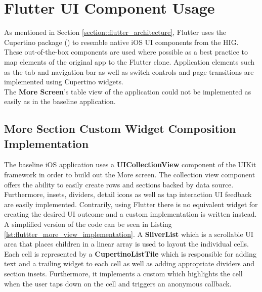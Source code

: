 \section{Flutter UI Component Usage} \label{section::flutter_ui_component_usage}
As mentioned in Section \ref{section::flutter_architecture}, Flutter uses the Cupertino package (\cite{CupertinoPackageDocumentation2021}) to resemble native iOS UI components from the HIG.
These out-of-the-box components are used where possible as a best practice to map elements of the original app to the Flutter clone. 
Application elements such as the tab and navigation bar as well as switch controls and page transitions are implemented using Cupertino widgets.\\
The \textbf{More Screen}'s table view of the application could not be implemented as easily as in the baseline application.

\subsection{More Section Custom Widget Composition Implementation}
The baseline iOS application uses a \textbf{UICollectionView} component of the UIKit framework in order to build out the More screen.
The collection view component offers the ability to easily create rows and sections backed by data source. 
Furthermore, insets, dividers, detail icons as well as tap interaction UI feedback are easily implemented. 
Contrarily, using Flutter there is no equivalent widget for creating the desired UI outcome and a custom implementation is written instead. 
A simplified version of the code can be seen in Listing \ref{lst:fluttter_more_view_implementation}.
A \textbf{SliverList} which is a scrollable UI area that places children in a linear array is used to layout the individual cells.
Each cell is represented by a \textbf{CupertinoListTile} which is responsible for adding text and a trailing widget to each cell as well as adding appropriate dividers and section insets.
Furthermore, it implements a custom  which highlights the cell when the user taps down on the cell and triggers an anonymous callback.

